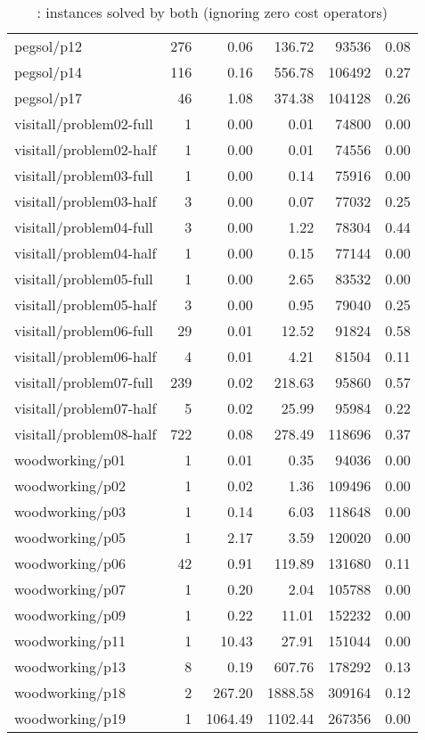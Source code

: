 \begin{table*}[htbp]
\begin{tabular}{lrrrrr}
  pegsol/p12 & 276 & 0.06 & 136.72 & 93536 & 0.08 \\ 
  pegsol/p14 & 116 & 0.16 & 556.78 & 106492 & 0.27 \\ 
  pegsol/p17 &  46 & 1.08 & 374.38 & 104128 & 0.26 \\ 
  visitall/problem02-full &   1 & 0.00 & 0.01 & 74800 & 0.00 \\ 
  visitall/problem02-half &   1 & 0.00 & 0.01 & 74556 & 0.00 \\ 
  visitall/problem03-full &   1 & 0.00 & 0.14 & 75916 & 0.00 \\ 
  visitall/problem03-half &   3 & 0.00 & 0.07 & 77032 & 0.25 \\ 
  visitall/problem04-full &   3 & 0.00 & 1.22 & 78304 & 0.44 \\ 
  visitall/problem04-half &   1 & 0.00 & 0.15 & 77144 & 0.00 \\ 
  visitall/problem05-full &   1 & 0.00 & 2.65 & 83532 & 0.00 \\ 
  visitall/problem05-half &   3 & 0.00 & 0.95 & 79040 & 0.25 \\ 
  visitall/problem06-full &  29 & 0.01 & 12.52 & 91824 & 0.58 \\ 
  visitall/problem06-half &   4 & 0.01 & 4.21 & 81504 & 0.11 \\ 
  visitall/problem07-full & 239 & 0.02 & 218.63 & 95860 & 0.57 \\ 
  visitall/problem07-half &   5 & 0.02 & 25.99 & 95984 & 0.22 \\ 
  visitall/problem08-half & 722 & 0.08 & 278.49 & 118696 & 0.37 \\ 
  woodworking/p01 &   1 & 0.01 & 0.35 & 94036 & 0.00 \\ 
  woodworking/p02 &   1 & 0.02 & 1.36 & 109496 & 0.00 \\ 
  woodworking/p03 &   1 & 0.14 & 6.03 & 118648 & 0.00 \\ 
  woodworking/p05 &   1 & 2.17 & 3.59 & 120020 & 0.00 \\ 
  woodworking/p06 &  42 & 0.91 & 119.89 & 131680 & 0.11 \\ 
  woodworking/p07 &   1 & 0.20 & 2.04 & 105788 & 0.00 \\ 
  woodworking/p09 &   1 & 0.22 & 11.01 & 152232 & 0.00 \\ 
  woodworking/p11 &   1 & 10.43 & 27.91 & 151044 & 0.00 \\ 
  woodworking/p13 &   8 & 0.19 & 607.76 & 178292 & 0.13 \\ 
  woodworking/p18 &   2 & 267.20 & 1888.58 & 309164 & 0.12 \\ 
  woodworking/p19 &   1 & 1064.49 & 1102.44 & 267356 & 0.00 \\ 
   \hline
\end{tabular}
\endgroup
\caption{\oursolver{}: instances solved by both (ignoring zero cost operators)} 
\label{tab:our_both_ignoring}
\end{table*}
